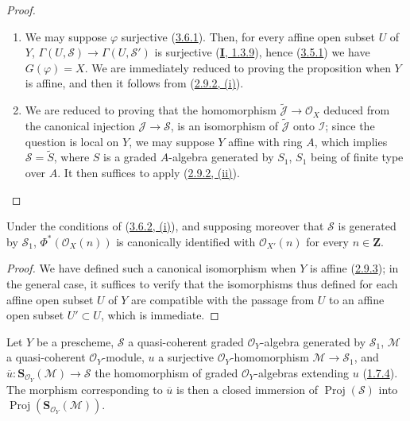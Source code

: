 \begin{proof}
\begin{enumerate}
  \item[\rm(i)] We may suppose $\varphi$ surjective
    (\hyperref[II.3.6.1]{3.6.1}). Then, for every affine open subset $U$ of
    $Y$, $\Gamma(U,\mathcal{S})\to\Gamma(U,\mathcal{S}')$ is surjective
    (\hyperref[I.1.3.9]{\textbf{I}, 1.3.9}), hence
    (\hyperref[II.3.5.1]{3.5.1}) we have $G(\varphi)=X$. We are
    immediately reduced to proving the proposition when $Y$ is affine,
    and then it follows from (\hyperref[II.2.9.2]{2.9.2, (i)}).
  \item[\rm(ii)] We are reduced to proving that the homomorphism
    $\widetilde{\mathcal{J}}\to\mathcal{O}_X$ deduced from the canonical injection
    $\mathcal{J}\to\mathcal{S}$, is an isomorphism of
    $\widetilde{\mathcal{J}}$ onto $\mathcal{I}$; since the question is local
    on $Y$, we may suppose $Y$ affine with ring $A$, which implies
    $\mathcal{S}=\widetilde{S}$, where $S$ is a graded $A$-algebra generated
    by $S_1$, $S_1$ being of finite type over $A$. It then suffices to apply
    (\hyperref[II.2.9.2]{2.9.2, (ii)}).
\end{enumerate}
\end{proof}

\begin{corollary}[3.6.3]
\label{II.3.6.3}
Under the conditions of \textup{(\hyperref[II.3.6.2]{3.6.2, (i)})}, and supposing
moreover that $\mathcal{S}$ is generated by $\mathcal{S}_1$,
$\Phi^*(\mathcal{O}_X(n))$ is canonically identified with
$\mathcal{O}_{X'}(n)$ for every $n\in\mathbf{Z}$.
\end{corollary}

\begin{proof}
We have defined such a canonical isomorphism when $Y$ is affine
(\hyperref[II.2.9.3]{2.9.3}); in the general case, it suffices to verify
that the isomorphisms thus defined for each affine open subset $U$ of $Y$ are
compatible with the passage from $U$ to an affine open subset $U'\subset U$,
which is immediate.
\end{proof}

\begin{corollary}[3.6.4]
\label{II.3.6.4}
Let $Y$ be a prescheme, $\mathcal{S}$ a quasi-coherent graded
$\mathcal{O}_Y$-algebra generated by $\mathcal{S}_1$, $\mathcal{M}$ a
quasi-coherent $\mathcal{O}_Y$-module, $u$ a surjective
$\mathcal{O}_Y$-homomorphism $\mathcal{M}\to\mathcal{S}_1$, and
$\overline{u}:\mathbf{S}_{\mathcal{O}_Y}(\mathcal{M})\to\mathcal{S}$
the homomorphism of graded $\mathcal{O}_Y$-algebras extending $u$
\textup{(\hyperref[II.1.7.4]{1.7.4})}. The morphism corresponding to
$\overline{u}$ is then a closed immersion of
$\operatorname{Proj}(\mathcal{S})$ into
$\operatorname{Proj}(\mathbf{S}_{\mathcal{O}_Y}(\mathcal{M}))$.
\end{corollary}


